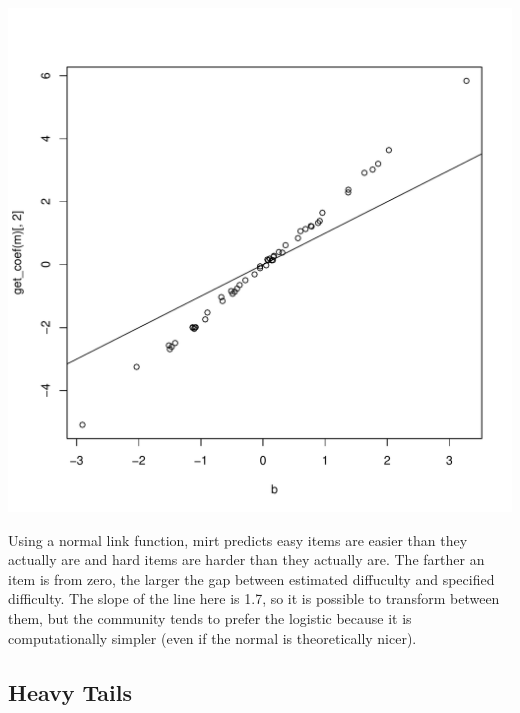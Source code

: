 \documentclass{article}\usepackage[]{graphicx}\usepackage[]{color}
\makeatletter
\def\maxwidth{ %
  \ifdim\Gin@nat@width>\linewidth
    \linewidth
  \else
    \Gin@nat@width
  \fi
}
\newenvironment{knitrout}{}{} %
\makeatother
\begin{document}
\begin{knitrout}
\color{fgcolor}
\includegraphics[width=\maxwidth]{figure/unnamed-chunk-6-1} 

\end{knitrout}

Using a normal link function, mirt predicts easy items are easier than they actually are and hard items are harder than they actually are.  The farther an item is from zero, the larger the gap between estimated diffuculty and specified difficulty.  The slope of the line here is 1.7, so it is possible to transform between them, but the community tends to prefer the logistic because it is computationally simpler (even if the normal is theoretically nicer).

\subsection{Heavy Tails}
\end{document}
